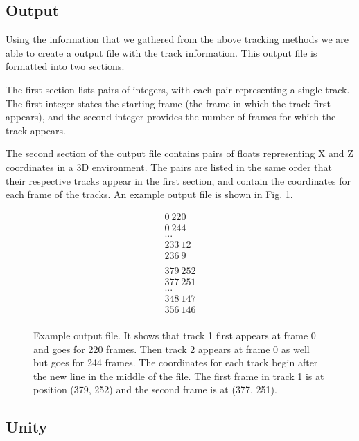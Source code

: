 \documentclass[12pt, onecolumn, conference]{IEEEtran}
\begin{document}
\subsection{Output}

Using the information that we gathered from the above tracking methods we are able to create a output file with the track information. This output file is formatted into two sections.

The first section lists pairs of integers, with each pair representing a single track. The first integer states the starting frame (the frame in which the track first appears), and the second integer provides the number of frames for which the track appears. 

The second section of the output file contains pairs of floats representing X and Z coordinates in a 3D environment. The pairs are listed in the same order that their respective tracks appear in the first section, and contain the coordinates for each frame of the tracks. An example output file is shown in Fig. \ref{Output}.

\begin{figure}
\begin{gather*}
0\ 220 \\
0\ 244 \\
...  \\
233\ 12 \\
236\ 9   \\
 \\
379\ 252 \\
377\ 251 \\
...  \\
348\ 147 \\
356\ 146 \\
\end{gather*}
\caption{Example output file. It shows that track 1 first appears at frame 0 and goes for 220 frames. Then track 2 appears at frame 0 as well but goes for 244 frames. The coordinates for each track begin after the new line in the middle of the file. The first frame in track 1 is at position (379, 252) and the second frame is at (377, 251).}
\label{Output}
\end{figure}

\subsection{Unity}
\end{document}
